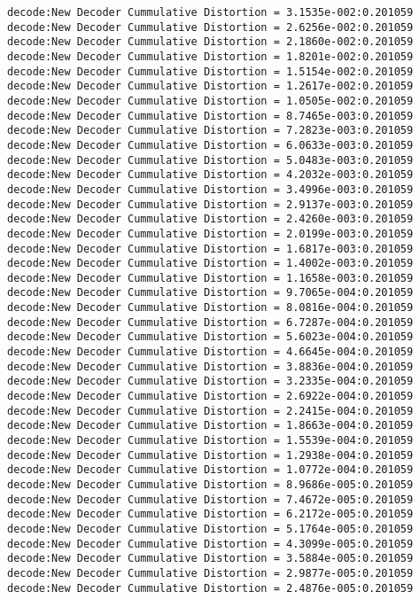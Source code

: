 \begin{verbatim}
decode:New Decoder Cummulative Distortion = 3.1535e-002:0.201059
decode:New Decoder Cummulative Distortion = 2.6256e-002:0.201059
decode:New Decoder Cummulative Distortion = 2.1860e-002:0.201059
decode:New Decoder Cummulative Distortion = 1.8201e-002:0.201059
decode:New Decoder Cummulative Distortion = 1.5154e-002:0.201059
decode:New Decoder Cummulative Distortion = 1.2617e-002:0.201059
decode:New Decoder Cummulative Distortion = 1.0505e-002:0.201059
decode:New Decoder Cummulative Distortion = 8.7465e-003:0.201059
decode:New Decoder Cummulative Distortion = 7.2823e-003:0.201059
decode:New Decoder Cummulative Distortion = 6.0633e-003:0.201059
decode:New Decoder Cummulative Distortion = 5.0483e-003:0.201059
decode:New Decoder Cummulative Distortion = 4.2032e-003:0.201059
decode:New Decoder Cummulative Distortion = 3.4996e-003:0.201059
decode:New Decoder Cummulative Distortion = 2.9137e-003:0.201059
decode:New Decoder Cummulative Distortion = 2.4260e-003:0.201059
decode:New Decoder Cummulative Distortion = 2.0199e-003:0.201059
decode:New Decoder Cummulative Distortion = 1.6817e-003:0.201059
decode:New Decoder Cummulative Distortion = 1.4002e-003:0.201059
decode:New Decoder Cummulative Distortion = 1.1658e-003:0.201059
decode:New Decoder Cummulative Distortion = 9.7065e-004:0.201059
decode:New Decoder Cummulative Distortion = 8.0816e-004:0.201059
decode:New Decoder Cummulative Distortion = 6.7287e-004:0.201059
decode:New Decoder Cummulative Distortion = 5.6023e-004:0.201059
decode:New Decoder Cummulative Distortion = 4.6645e-004:0.201059
decode:New Decoder Cummulative Distortion = 3.8836e-004:0.201059
decode:New Decoder Cummulative Distortion = 3.2335e-004:0.201059
decode:New Decoder Cummulative Distortion = 2.6922e-004:0.201059
decode:New Decoder Cummulative Distortion = 2.2415e-004:0.201059
decode:New Decoder Cummulative Distortion = 1.8663e-004:0.201059
decode:New Decoder Cummulative Distortion = 1.5539e-004:0.201059
decode:New Decoder Cummulative Distortion = 1.2938e-004:0.201059
decode:New Decoder Cummulative Distortion = 1.0772e-004:0.201059
decode:New Decoder Cummulative Distortion = 8.9686e-005:0.201059
decode:New Decoder Cummulative Distortion = 7.4672e-005:0.201059
decode:New Decoder Cummulative Distortion = 6.2172e-005:0.201059
decode:New Decoder Cummulative Distortion = 5.1764e-005:0.201059
decode:New Decoder Cummulative Distortion = 4.3099e-005:0.201059
decode:New Decoder Cummulative Distortion = 3.5884e-005:0.201059
decode:New Decoder Cummulative Distortion = 2.9877e-005:0.201059
decode:New Decoder Cummulative Distortion = 2.4876e-005:0.201059

\end{verbatim}
